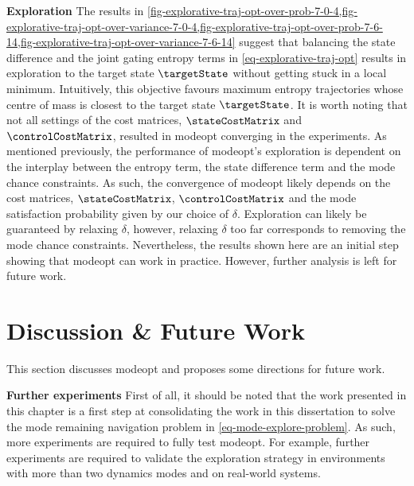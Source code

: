 \documentclass{mimosis-class/mimosis}
\numberwithin{equation}{chapter}
\begin{document}
{\newline


\textbf{Exploration}
The results in
\cref{fig-explorative-traj-opt-over-prob-7-0-4,fig-explorative-traj-opt-over-variance-7-0-4,fig-explorative-traj-opt-over-prob-7-6-14,fig-explorative-traj-opt-over-variance-7-6-14}
suggest that balancing the state difference and the joint gating entropy terms in
\cref{eq-explorative-traj-opt} results in exploration to the target state \(\targetState\)
without getting stuck in a local minimum.
Intuitively, this objective favours maximum entropy trajectories whose centre of mass is closest
to the target state \(\targetState\).
It is worth noting that not all settings of the
cost matrices, \(\stateCostMatrix\) and \(\controlCostMatrix\), resulted in \acrshort{modeopt} converging in the experiments.
As mentioned previously, the performance of \acrshort{modeopt}'s exploration is dependent on the interplay between
the entropy term, the state difference term and the mode chance constraints.
As such, the convergence of \acrshort{modeopt} likely depends on the cost matrices,
\(\stateCostMatrix\), \(\controlCostMatrix\) and the mode satisfaction probability given by our choice of \(\delta\).
Exploration can likely be guaranteed by relaxing \(\delta\), however,
relaxing \(\delta\) too far corresponds to removing the mode chance constraints.
Nevertheless, the results shown here are an initial step showing that \acrshort{modeopt} can work in practice.
However, further analysis is left for future work.

\section{Discussion \& Future Work \label{sec-future-work-explore}}
\label{sec:orgcaf36f0}
This section discusses \acrshort{modeopt} and proposes some directions for future work.
\newline

\textbf{Further experiments}
First of all, it should be noted that the work presented in this chapter is a first step
at consolidating the work in this dissertation to solve the
mode remaining navigation problem in \cref{eq-mode-explore-problem}.
As such, more experiments are required to fully test \acrshort{modeopt}.
For example, further experiments are required to validate the exploration strategy in environments with more
than two dynamics modes and on real-world systems.

}
\end{document}
